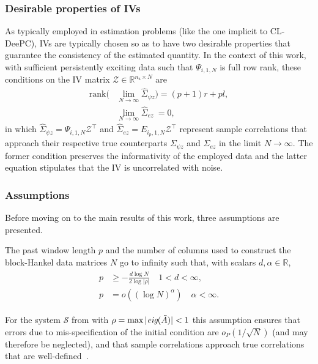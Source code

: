 \subsubsection{Desirable properties of \ac{IVs}}\label{sec:IV_props}
\noindent As typically employed in estimation problems (like the one implicit to \ac{CL-DeePC}), \ac{IVs} are typically chosen so as to have two desirable properties that guarantee the consistency of the estimated quantity. In the context of this work, with sufficient persistently exciting data such that $\Psi_{i,1,N}$ is full row rank, these conditions on the \acs{IV} matrix $\mathcal{Z}\in\mathbb{R}^{n_\mathrm{z}\times N}$ are~\citep{Verhaegen2007a}
\begin{align}
\text{rank}\Big(&\lim_{N\rightarrow\infty}\hat{\Sigma}_{\psi z}
\Big) = (p+1)r+pl, \label{eq:IV_preserve_info}\\
&\lim_{N\rightarrow\infty}\hat{\Sigma}_{ez}
\:=0,\label{eq:IV_noise_uncorr}
\end{align}
in which ${\hat{\Sigma}_{\psi z}=\Psi_{i,1,N}\mathcal{Z}^\top}$ and ${\hat{\Sigma}_{ez}=E_{i_p,1,N}\mathcal{Z}^\top}$ represent sample correlations that approach their respective true counterparts $\Sigma_{\psi z}$ and $\Sigma_{ez}$ in the limit $N\rightarrow\infty$. The former condition preserves the informativity of the employed data and the latter equation stipulates that the \acs{IV} is uncorrelated with noise.
\subsubsection{Assumptions}
\noindent Before moving on to the main results of this work, three assumptions are presented.
\setcounter{thm}{0}
\begin{assum}\label{assum:relative-rates}
    The past window length $p$ and the number of columns used to construct the block-Hankel data matrices $N$ go to infinity such that, with scalars $d,\alpha\in\mathbb{R}$,
    \begin{align}\label{eq:relative_rates}
        \begin{split}
            p &\geq -\frac{d\log N}{2\log|\rho|} \quad 1 < d < \infty,\\
            p&=o((\log N)^\alpha) \quad \alpha < \infty.
        \end{split}
    \end{align}
\end{assum}
For the system $\mathcal{S}$ from  with $\rho=\max|\emph{eig}(\tilde{A})|<1$ this assumption ensures that errors due to mis-specification of the initial condition are $o_P(1/\sqrt{N})$ (and may therefore be neglected), and that sample correlations approach true correlations that are well-defined~\citep{Bauer2002,Chiuso2006}.

